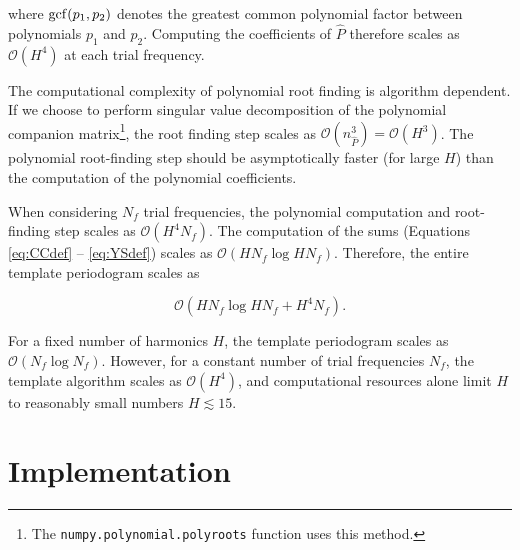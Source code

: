 \documentclass[iop]{emulateapj}
\newcommand{\bigO}{\mathcal{O}}
\begin{document}
\noindent where ${\rm gcf}(p_1, p_2)$ denotes the greatest common polynomial factor
between polynomials $p_1$ and $p_2$. Computing the coefficients of $\hat{P}$ therefore
scales as $\bigO(H^4)$ at each trial frequency. 

The computational complexity of polynomial root finding
is algorithm dependent. If we choose to perform singular value decomposition of
the polynomial companion matrix\footnote{The \texttt{numpy.polynomial.polyroots} 
function uses this method.}, the root finding step scales as 
$\bigO(n_{\hat{P}}^3) = \bigO(H^3)$. The polynomial root-finding step 
should be asymptotically faster (for large $H$) than the computation of 
the polynomial coefficients.

When considering $N_f$ trial frequencies, the polynomial computation and root-finding 
step scales as $\bigO(H^4N_f)$. The computation of the sums 
(Equations \ref{eq:CCdef} -- \ref{eq:YSdef}) scales as $\bigO(HN_f\log HN_f)$.
Therefore, the entire template periodogram scales as 

\begin{equation}
\bigO(HN_f \log HN_f + H^4N_f).
\end{equation}

For a fixed number of harmonics $H$, the template periodogram scales as
$\bigO(N_f\log N_f)$. However, for a constant number of trial frequencies $N_f$, 
the template algorithm scales as $\bigO(H^4)$, and computational resources
alone limit $H$ to reasonably small numbers $H\lesssim15$.


\section{Implementation}
\end{document}
